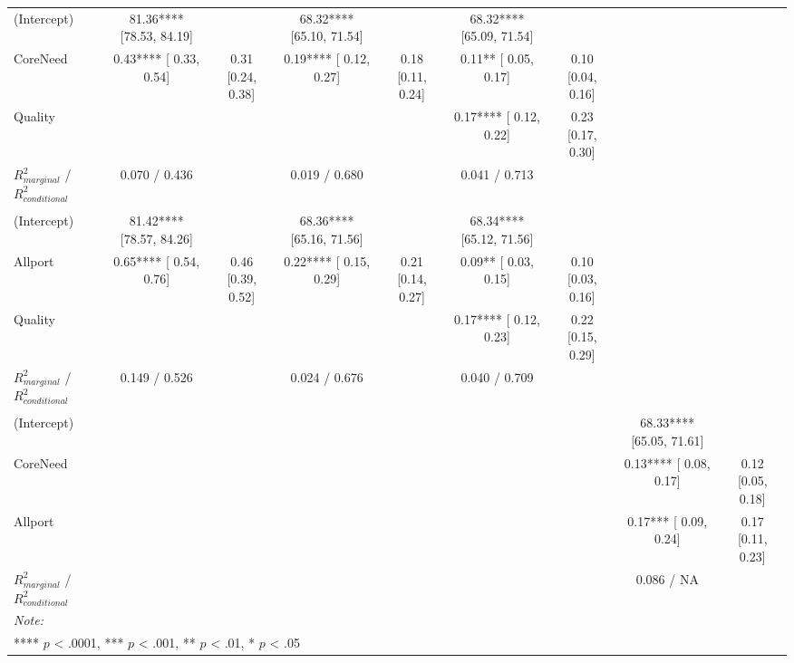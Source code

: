 \begin{landscape}
\begin{table}
\begin{minipage}[t][\textheight][t]{\textwidth}
{\begin{tabular}[t]{lcccccccc}
\hspace{1em}(Intercept) & 81.36**** [78.53, 84.19] &  & 68.32**** [65.10, 71.54] &  & 68.32**** [65.09, 71.54] &  &  & \\
\hspace{1em}CoreNeed & 0.43**** [ 0.33,  0.54] & 0.31 [0.24, 0.38] & 0.19**** [ 0.12,  0.27] & 0.18 [0.11, 0.24] & 0.11** [ 0.05,  0.17] & 0.10 [0.04, 0.16] &  & \\
\hspace{1em}Quality &  &  &  &  & 0.17**** [ 0.12,  0.22] & 0.23 [0.17, 0.30] &  & \\
\hspace{1em}$R^2_{marginal}$ / $R^2_{conditional}$ & 0.070 / 0.436 &  & 0.019 / 0.680 &  & 0.041 / 0.713 &  &  & \\
\addlinespace[0.3em]
\multicolumn{9}{l}{\textbf{Study 3: Allport}}\\
\hspace{1em}(Intercept) & 81.42**** [78.57, 84.26] &  & 68.36**** [65.16, 71.56] &  & 68.34**** [65.12, 71.56] &  &  & \\
\hspace{1em}Allport & 0.65**** [ 0.54,  0.76] & 0.46 [0.39, 0.52] & 0.22**** [ 0.15,  0.29] & 0.21 [0.14, 0.27] & 0.09** [ 0.03,  0.15] & 0.10 [0.03, 0.16] &  & \\
\hspace{1em}Quality &  &  &  &  & 0.17**** [ 0.12,  0.23] & 0.22 [0.15, 0.29] &  & \\
\hspace{1em}$R^2_{marginal}$ / $R^2_{conditional}$ & 0.149 / 0.526 &  & 0.024 / 0.676 &  & 0.040 / 0.709 &  &  & \\
\addlinespace[0.3em]
\multicolumn{9}{l}{\textbf{Study 3: Needs \& Allport}}\\
\hspace{1em}(Intercept) &  &  &  &  &  &  & 68.33**** [65.05, 71.61] & \\
\hspace{1em}CoreNeed &  &  &  &  &  &  & 0.13**** [ 0.08,  0.17] & 0.12 [0.05, 0.18]\\
\hspace{1em}Allport &  &  &  &  &  &  & 0.17*** [ 0.09,  0.24] & 0.17 [0.11, 0.23]\\
\hspace{1em}$R^2_{marginal}$ / $R^2_{conditional}$ &  &  &  &  &  &  & 0.086 / NA & \\
\bottomrule
\multicolumn{9}{l}{\rule{0pt}{1em}\textit{Note: }}\\
\multicolumn{9}{l}{\rule{0pt}{1em}**** $p$ < .0001, *** $p$ < .001, ** $p$ < .01, * $p$ < .05}\\
\end{tabular}}
\end{minipage}
\end{table}
\end{landscape}
